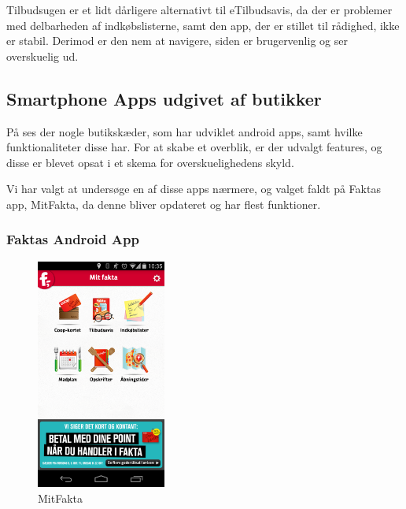 Tilbudsugen er et lidt dårligere alternativt til eTilbudsavis, da der er problemer med delbarheden af indkøbslisterne, samt den app, der er stillet til rådighed, ikke er stabil.
Derimod er den nem at navigere, siden er brugervenlig og ser overskuelig ud.

\subsection{Smartphone Apps udgivet af butikker}
På  ses der nogle butikskæder, som har udviklet android apps, samt hvilke funktionaliteter disse har.
For at skabe et overblik, er der udvalgt features, og disse er blevet opsat i et skema for overskuelighedens skyld.

Vi har valgt at undersøge en af disse apps nærmere, og valget faldt på Faktas app, MitFakta, da denne bliver opdateret og har flest funktioner.
\subsubsection{Faktas Android App}

\begin{figure}
\vspace{-20pt}
	\begin{center}
		\includegraphics[width=0.38\textwidth]{images/Images/MitFakta.png}
	\end{center}
	\vspace{-20pt}
	\caption{MitFakta}
	\vspace{-20pt}
	\label{ss:MitFakta}
\end{figure}


